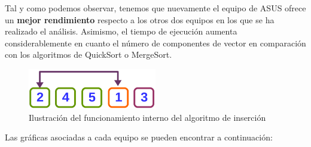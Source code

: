 \documentclass{homework}
\begin{document}
    Tal y como podemos observar, tenemos que nuevamente el equipo de ASUS ofrece un \textbf{mejor rendimiento} respecto a los otros
    dos equipos en los que se ha realizado el análisis. Asimismo, el tiempo de ejecución aumenta considerablemente
    en cuanto el número de componentes de vector en comparación con los algoritmos de QuickSort o MergeSort. 

    \begin{figure}[h]
        \centering
        \includegraphics[width=0.5\textwidth]{img/insercion.png}
        \caption{Ilustración del funcionamiento interno del algoritmo de inserción}
    \end{figure}

    Las gráficas asociadas a cada equipo se pueden encontrar a continuación:
\end{document}
